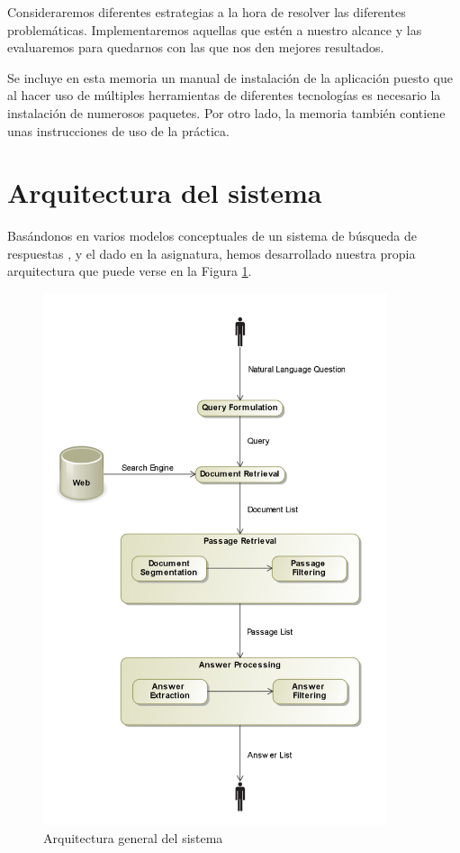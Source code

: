 \documentclass[12pt,a4paper,titlepage]{article}
\begin{document}
Consideraremos diferentes estrategias a la hora de resolver las diferentes problemáticas. Implementaremos aquellas que estén a nuestro alcance y las evaluaremos para quedarnos con las que nos den mejores resultados.

Se incluye en esta memoria un manual de instalación de la aplicación puesto que al hacer uso de múltiples herramientas de diferentes tecnologías es necesario la instalación de numerosos paquetes. Por otro lado, la memoria también contiene unas instrucciones de uso de la práctica.

\clearpage
\section{Arquitectura del sistema}
Basándonos en varios modelos conceptuales de un sistema de búsqueda de respuestas \cite{modelo1}, \cite{modelo2} y el dado en la asignatura, hemos desarrollado nuestra propia arquitectura que puede verse en la Figura \ref{fig:arquitectura}.

\begin{figure}[h!]
\begin{center}
\includegraphics[width=0.9\textwidth]{res/arquitectura}
\end{center}
\caption{Arquitectura general del sistema}
\label{fig:arquitectura}
\end{figure}
\end{document}
